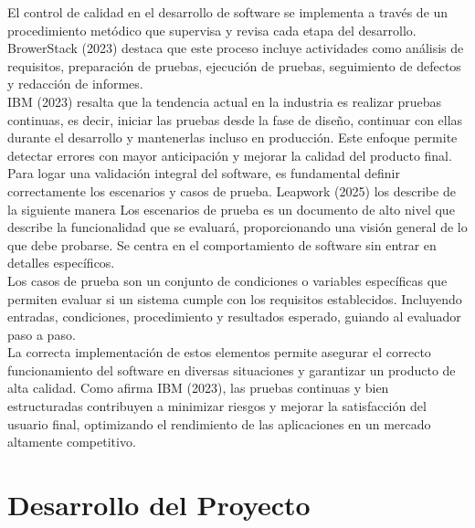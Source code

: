 \documentclass[12pt,letterpaper,spanish, xcolor=table]{report}
\begin{document}
El control de calidad en el desarrollo de software se implementa a través de un procedimiento metódico que supervisa y revisa cada etapa del desarrollo. BrowerStack (2023) destaca que este proceso incluye actividades como análisis de requisitos, preparación de pruebas, ejecución de pruebas, seguimiento de defectos y redacción de informes.\\

IBM (2023) resalta que la tendencia actual en la industria es realizar pruebas continuas, es decir, iniciar las pruebas desde la fase de diseño, continuar con ellas durante el desarrollo y mantenerlas incluso en producción. Este enfoque permite detectar errores con mayor anticipación y mejorar la calidad del producto final.\\

Para logar una validación integral del software, es fundamental definir correctamente los escenarios y casos de prueba. Leapwork (2025) los describe de la siguiente manera
Los escenarios de prueba es un documento de alto nivel que describe la funcionalidad que se evaluará, proporcionando una visión general de lo que debe probarse. Se centra en el comportamiento de software sin entrar en detalles específicos.\\

Los casos de prueba son un conjunto de condiciones o variables específicas que permiten evaluar si un sistema cumple con los requisitos establecidos. Incluyendo entradas, condiciones, procedimiento y resultados esperado, guiando al evaluador paso a paso.\\

La correcta implementación de estos elementos permite asegurar el correcto funcionamiento del software en diversas situaciones y garantizar un producto de alta calidad. Como afirma IBM (2023), las pruebas continuas y bien estructuradas contribuyen a minimizar riesgos y mejorar la satisfacción del usuario final, optimizando el rendimiento de las aplicaciones en un mercado altamente competitivo.\\






\chapter{Desarrollo del Proyecto}
\newpage
	
\end{document}
